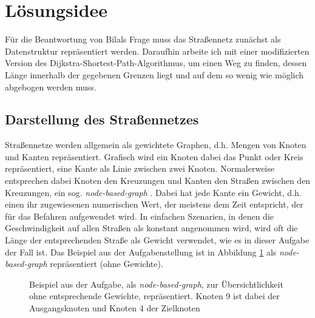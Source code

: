 \documentclass[a4paper,10pt,ngerman]{scrartcl}
\title{\Aufgabe}
\author{\Name\\Team-ID: \Einsendenummer}
\date{31. März 2020}
\begin{document}
\maketitle
\tableofcontents

\section{Lösungsidee}
\label{sec:idea}
Für die Beantwortung von Bilals Frage muss das Straßennetz zunächst als Datenstruktur repräsentiert werden.
Daraufhin arbeite ich mit einer modifizierten Version des Dijkstra-Shortest-Path-Algorithmus, um einen Weg zu finden, dessen Länge innerhalb der gegebenen Grenzen liegt und auf dem so wenig wie möglich abgebogen werden muss.

\subsection{Darstellung des Straßennetzes}
\label{sec:idea:representation}
Straßennetze werden allgemein als gewichtete Graphen, d.h. Mengen von Knoten und Kanten repräsentiert.
Grafisch wird ein Knoten dabei das Punkt oder Kreis repräsentiert, eine Kante als Linie zwischen zwei Knoten. 
Normalerweise entsprechen dabei Knoten den Kreuzungen und Kanten den Straßen zwischen den Kreuzungen, ein sog. \textit{node-based-graph} \cite{geisberger}.
Dabei hat jede Kante ein Gewicht, d.h. einen ihr zugewiesenen numerischen Wert, der meistens dem Zeit entspricht, der für das Befahren aufgewendet wird.
In einfachen Szenarien, in denen die Geschwindigkeit auf allen Straßen als konstant angenommen wird, wird oft die Länge der entsprechenden Straße als Gewicht verwendet, wie es in dieser Aufgabe der Fall ist.
Das Beispiel aus der Aufgabenstellung ist in Abbildung \ref{fig:graph-idee} als \textit{node-based-graph} repräsentiert (ohne Gewichte).

\begin{figure}
\centering
{}
\label{fig:graph-idee}
\caption{Beispiel aus der Aufgabe, als \textit{node-based-graph}, zur Übersichtlichkeit ohne entsprechende Gewichte, repräsentiert. Knoten 9 ist dabei der Ausgangsknoten und Knoten 4 der Zielknoten}
\end{figure}
\end{document}
